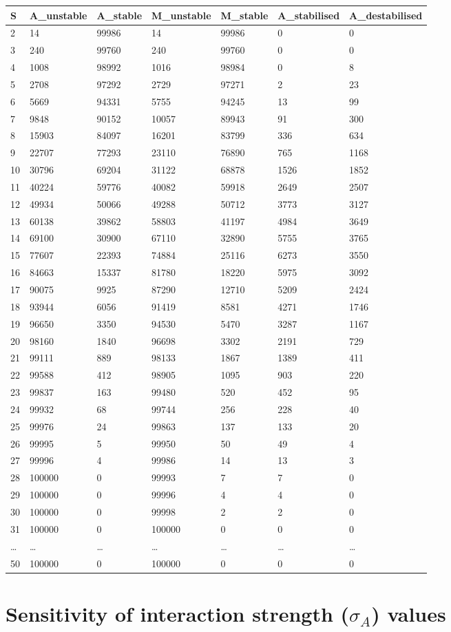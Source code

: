 \documentclass[]{article}
\begin{document}
\begin{longtable}[]{@{}lllllll@{}}
\toprule
S & A\_unstable & A\_stable & M\_unstable & M\_stable & A\_stabilised &
A\_destabilised\tabularnewline
\midrule
\endhead
2 & 14 & 99986 & 14 & 99986 & 0 & 0\tabularnewline
3 & 240 & 99760 & 240 & 99760 & 0 & 0\tabularnewline
4 & 1008 & 98992 & 1016 & 98984 & 0 & 8\tabularnewline
5 & 2708 & 97292 & 2729 & 97271 & 2 & 23\tabularnewline
6 & 5669 & 94331 & 5755 & 94245 & 13 & 99\tabularnewline
7 & 9848 & 90152 & 10057 & 89943 & 91 & 300\tabularnewline
8 & 15903 & 84097 & 16201 & 83799 & 336 & 634\tabularnewline
9 & 22707 & 77293 & 23110 & 76890 & 765 & 1168\tabularnewline
10 & 30796 & 69204 & 31122 & 68878 & 1526 & 1852\tabularnewline
11 & 40224 & 59776 & 40082 & 59918 & 2649 & 2507\tabularnewline
12 & 49934 & 50066 & 49288 & 50712 & 3773 & 3127\tabularnewline
13 & 60138 & 39862 & 58803 & 41197 & 4984 & 3649\tabularnewline
14 & 69100 & 30900 & 67110 & 32890 & 5755 & 3765\tabularnewline
15 & 77607 & 22393 & 74884 & 25116 & 6273 & 3550\tabularnewline
16 & 84663 & 15337 & 81780 & 18220 & 5975 & 3092\tabularnewline
17 & 90075 & 9925 & 87290 & 12710 & 5209 & 2424\tabularnewline
18 & 93944 & 6056 & 91419 & 8581 & 4271 & 1746\tabularnewline
19 & 96650 & 3350 & 94530 & 5470 & 3287 & 1167\tabularnewline
20 & 98160 & 1840 & 96698 & 3302 & 2191 & 729\tabularnewline
21 & 99111 & 889 & 98133 & 1867 & 1389 & 411\tabularnewline
22 & 99588 & 412 & 98905 & 1095 & 903 & 220\tabularnewline
23 & 99837 & 163 & 99480 & 520 & 452 & 95\tabularnewline
24 & 99932 & 68 & 99744 & 256 & 228 & 40\tabularnewline
25 & 99976 & 24 & 99863 & 137 & 133 & 20\tabularnewline
26 & 99995 & 5 & 99950 & 50 & 49 & 4\tabularnewline
27 & 99996 & 4 & 99986 & 14 & 13 & 3\tabularnewline
28 & 100000 & 0 & 99993 & 7 & 7 & 0\tabularnewline
29 & 100000 & 0 & 99996 & 4 & 4 & 0\tabularnewline
30 & 100000 & 0 & 99998 & 2 & 2 & 0\tabularnewline
31 & 100000 & 0 & 100000 & 0 & 0 & 0\tabularnewline
\ldots{} & \ldots{} & \ldots{} & \ldots{} & \ldots{} & \ldots{} &
\ldots{}\tabularnewline
50 & 100000 & 0 & 100000 & 0 & 0 & 0\tabularnewline
\bottomrule
\end{longtable}

\hypertarget{sigma}{\section{\texorpdfstring{Sensitivity of interaction
strength (\(\sigma_{A}\))
values}{Sensitivity of interaction strength (\textbackslash{}sigma\_\{A\}) values}}\label{sigma}}
\end{document}
